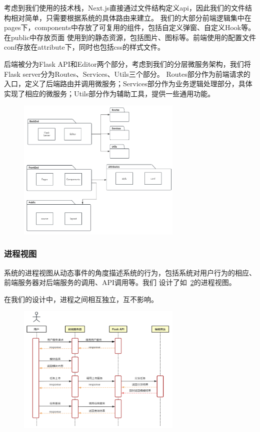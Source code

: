 考虑到我们使用的技术栈，Next.js直接通过文件结构定义api，因此我们的文件结构相对简单，只需要根据系统的具体路由来建立。
我们的大部分前端逻辑集中在pages下，components中存放了可复用的组件，包括自定义弹窗、自定义Hook等。在public中存放页面
使用到的静态资源，包括图片、图标等。前端使用的配置文件conf存放在attribute下，同时也包括css的样式文件。

后端被分为Flask API和Editor两个部分，考虑到我们的分层微服务架构，我们将Flask server分为Routes、Services、Utils三个部分。
Routes部分作为前端请求的入口，定义了后端路由并调用微服务；Services部分作为业务逻辑处理部分，具体实现了相应的微服务；Utils部分作为辅助工具，提供一些通用功能。

\begin{figure}[ht]
    \centering
    \includegraphics[width=0.7\textwidth]{source/img/system_develop.png}
    \label{fig:system-develop}
\end{figure}

\subsubsection{进程视图}

系统的进程视图从动态事件的角度描述系统的行为，包括系统对用户行为的相应、前端服务器对后端服务的调用、API调用等。我们
设计了如~\ref{fig:system-process}的进程视图。

在我们的设计中，进程之间相互独立，互不影响。

\begin{figure}[ht]
    \centering
    \includegraphics[width=0.7\textwidth]{source/img/system_process.png}
    \label{fig:system-process}
\end{figure}


